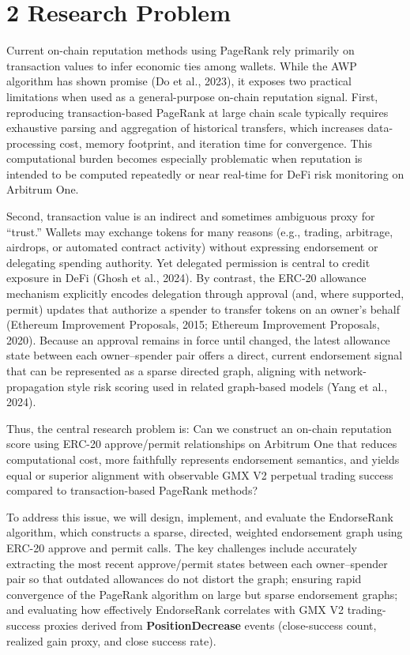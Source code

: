 \clearpage
{}
\section*{2 \textbf{Research Problem}}
\label{sec:research-problem}

Current on-chain reputation methods using PageRank rely primarily on transaction values to infer economic ties among wallets. While the AWP algorithm has shown promise (Do et al., 2023), it exposes two practical limitations when used as a general-purpose on-chain reputation signal. First, reproducing transaction-based PageRank at large chain scale typically requires exhaustive parsing and aggregation of historical transfers, which increases data-processing cost, memory footprint, and iteration time for convergence. This computational burden becomes especially problematic when reputation is intended to be computed repeatedly or near real-time for DeFi risk monitoring on Arbitrum One.


Second, transaction value is an indirect and sometimes ambiguous proxy for ``trust.'' Wallets may exchange tokens for many reasons (e.g., trading, arbitrage, airdrops, or automated contract activity) without expressing endorsement or delegating spending authority. Yet delegated permission is central to credit exposure in DeFi (Ghosh et al., 2024). By contrast, the ERC-20 allowance mechanism explicitly encodes delegation through approval (and, where supported, permit) updates that authorize a spender to transfer tokens on an owner's behalf (Ethereum Improvement Proposals, 2015; Ethereum Improvement Proposals, 2020). Because an approval remains in force until changed, the latest allowance state between each owner--spender pair offers a direct, current endorsement signal that can be represented as a sparse directed graph, aligning with network-propagation style risk scoring used in related graph-based models (Yang et al., 2024).


Thus, the central research problem is: Can we construct an on-chain reputation score using ERC-20 approve/permit relationships on Arbitrum One that reduces computational cost, more faithfully represents endorsement semantics, and yields equal or superior alignment with observable GMX V2 perpetual trading success compared to transaction-based PageRank methods?


To address this issue, we will design, implement, and evaluate the EndorseRank algorithm, which constructs a sparse, directed, weighted endorsement graph using ERC-20 approve and permit calls. The key challenges include accurately extracting the most recent approve/permit states between each owner--spender pair so that outdated allowances do not distort the graph; ensuring rapid convergence of the PageRank algorithm on large but sparse endorsement graphs; and evaluating how effectively EndorseRank correlates with GMX V2 trading-success proxies derived from \textbf{PositionDecrease} events (close-success count, realized gain proxy, and close success rate).


